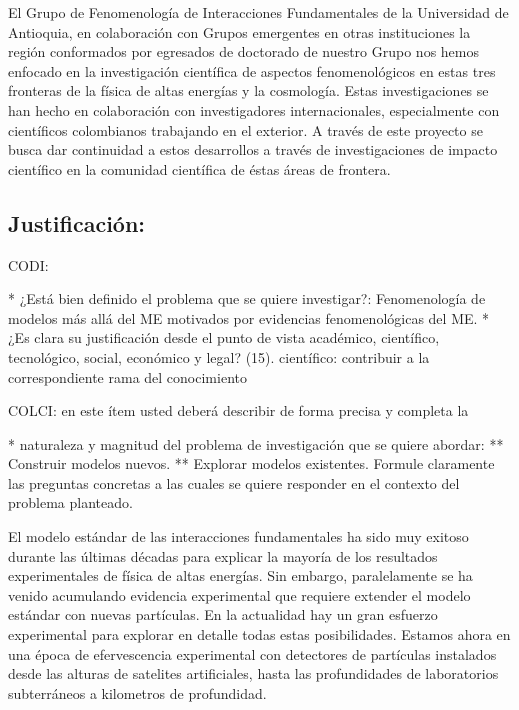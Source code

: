 El Grupo de Fenomenología de Interacciones Fundamentales de la
Universidad de Antioquia, en colaboración con Grupos emergentes en
otras instituciones la región conformados por egresados de doctorado
de nuestro Grupo nos hemos enfocado en la investigación científica de
aspectos fenomenológicos en estas tres fronteras de la física de altas
energías y la cosmología. Estas investigaciones se han hecho en
colaboración con investigadores internacionales, especialmente con
científicos colombianos trabajando en el exterior. A través de este
proyecto se busca dar continuidad a estos desarrollos a través de
investigaciones de impacto científico en la comunidad científica de
éstas áreas de frontera.

\subsection{Justificación:                                 }
\begin{instrucciones}
  CODI: 

  * ¿Está bien definido el problema que se quiere investigar?:
  Fenomenología de modelos más allá del ME motivados por evidencias
  fenomenológicas del ME.  
  * ¿Es clara su justificación desde el punto de vista académico,
  científico, tecnológico, social, económico y legal? (15).
  científico: contribuir a la correspondiente rama del conocimiento

  COLCI: en este ítem usted deberá describir de forma precisa y completa la
  
  * naturaleza y magnitud del problema de investigación que se quiere
  abordar:
  ** Construir modelos nuevos.
  ** Explorar modelos existentes.
  Formule claramente las preguntas concretas a las cuales se
  quiere responder en el contexto del problema planteado.
\end{instrucciones}
El modelo estándar de las interacciones fundamentales ha sido muy
exitoso durante las últimas décadas para explicar la mayoría de los
resultados experimentales de física de altas energías. Sin embargo,
paralelamente se ha venido acumulando evidencia experimental que
requiere extender el modelo estándar con nuevas partículas. En la
actualidad hay un gran esfuerzo experimental para explorar en detalle
todas estas posibilidades. Estamos ahora en una época de efervescencia
experimental con detectores de partículas instalados desde las alturas
de satelites artificiales, hasta las profundidades de laboratorios
subterráneos a kilometros de profundidad.

